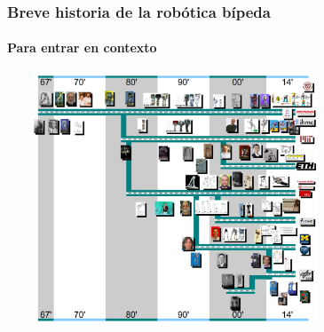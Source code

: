 \mode*
\begin{frame}[label=timeline]
  \timelineTime
  \frametitle{Breve historia de la rob\'otica b\'ipeda}
  \framesubtitle{Para entrar en contexto}
  \includegraphics[height=7.5cm,width=10.0cm]{../images/TimeLine_0.png}
\end{frame}
